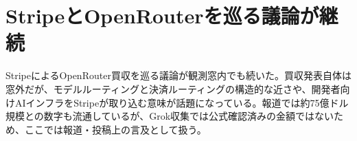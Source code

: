 \section{StripeとOpenRouterを巡る議論が継続}
StripeによるOpenRouter買収を巡る議論が観測窓内でも続いた。買収発表自体は窓外だが、モデルルーティングと決済ルーティングの構造的な近さや、開発者向けAIインフラをStripeが取り込む意味が話題になっている。報道では約75億ドル規模との数字も流通しているが、Grok収集では公式確認済みの金額ではないため、ここでは報道・投稿上の言及として扱う。
